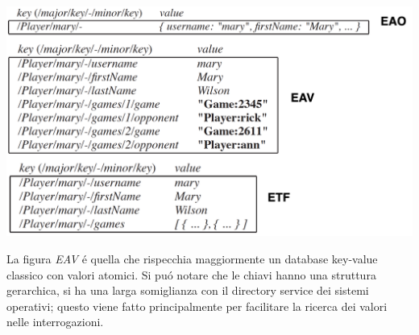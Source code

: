\includegraphics[width=1\textwidth]{img/implementazione}

La figura \emph{EAV} é quella che rispecchia maggiormente un database key-value classico con valori atomici.
Si puó notare che le chiavi hanno una struttura gerarchica, si ha una larga somiglianza con il directory service dei sistemi operativi;
questo viene fatto principalmente per facilitare la ricerca dei valori nelle interrogazioni.
